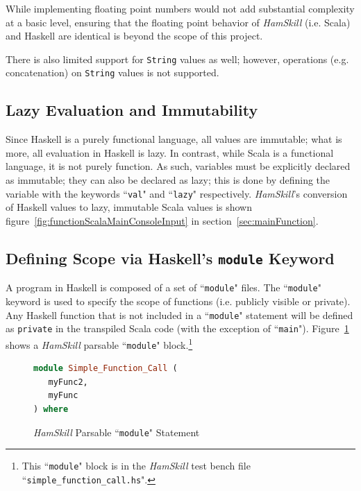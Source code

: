 \documentclass{report}
\begin{document}
While implementing floating point numbers would not add substantial complexity at a basic level, ensuring that the floating point behavior of \emph{HamSkill} (i.e. Scala) and Haskell are identical is beyond the scope of this project.

There is also limited support for \texttt{String} values as well; however, operations (e.g. concatenation) on \texttt{String} values is not supported.

\subsection{Lazy Evaluation and Immutability}

Since Haskell is a purely functional language, all values are immutable; what is more, all evaluation in Haskell is lazy.  In contrast, while Scala is a functional language, it is not purely function.  As such, variables must be explicitly declared as immutable; they can also be declared as lazy; this is done by defining the variable with the keywords ``\texttt{val}" and ``\texttt{lazy}" respectively.  \textit{HamSkill}'s conversion of Haskell values to lazy, immutable Scala values is shown figure~\ref{fig:functionScalaMainConsoleInput} in section~\ref{sec:mainFunction}.

\subsection{Defining Scope via Haskell's {\tt module} Keyword}

A program in Haskell is composed of a set of ``{\tt module}" files.  The ``{\tt module}" keyword is used to specify the scope of functions (i.e. publicly visible or private). Any Haskell function that is not included in a ``\texttt{module}" statement will be defined as \texttt{private} in the transpiled Scala code (with the exception of ``\texttt{main}").  Figure~\ref{fig:haskellModule} shows a \textit{HamSkill} parsable ``\texttt{module}" block.\footnote{This ``\texttt{module}" block is in the \textit{HamSkill} test bench file ``\texttt{simple\_function\_call.hs}".}

\begin{figure}[H]
\begin{mdframed}
\begin{lstlisting}[language=Haskell]
module Simple_Function_Call (
   myFunc2,
   myFunc
) where
\end{lstlisting}
\end{mdframed}
\caption{\textit{HamSkill} Parsable ``\texttt{module}" Statement}\label{fig:haskellModule}
\end{figure}
\end{document}
